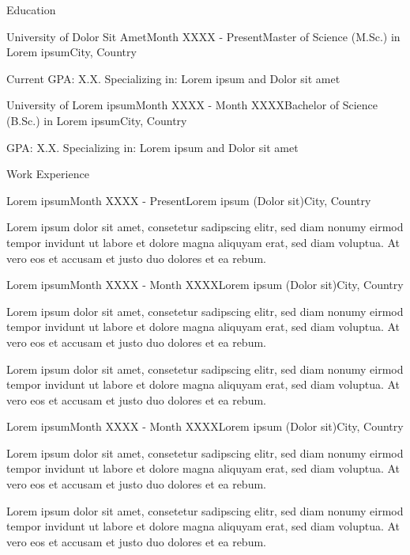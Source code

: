 \documentclass{resume}
\begin{document}
	
	\begin{cvSection}{Education}
		
		\begin{cvSubsection}{University of Dolor Sit Amet}{Month XXXX - Present}{Master of Science (M.Sc.) in Lorem ipsum}{City, Country}
			\item Current GPA: X.X. Specializing in: Lorem ipsum and Dolor sit amet
		\end{cvSubsection}
		
		\begin{cvSubsection}{University of Lorem ipsum}{Month XXXX - Month XXXX}{Bachelor of Science (B.Sc.) in Lorem ipsum}{City, Country}
			\item GPA: X.X. Specializing in: Lorem ipsum and Dolor sit amet
		\end{cvSubsection}
		
	\end{cvSection}
	
	\begin{cvSection}{Work Experience}
		
		\begin{cvSubsection}{Lorem ipsum}{Month XXXX - Present}{Lorem ipsum (Dolor sit)}{City, Country}
			\item Lorem ipsum dolor sit amet, consetetur sadipscing elitr, sed diam nonumy eirmod tempor invidunt ut labore et dolore magna aliquyam erat, sed diam voluptua. At vero eos et accusam et justo duo dolores et ea rebum.
		\end{cvSubsection}
		
		\begin{cvSubsection}{Lorem ipsum}{Month XXXX - Month XXXX}{Lorem ipsum (Dolor sit)}{City, Country}
			\item Lorem ipsum dolor sit amet, consetetur sadipscing elitr, sed diam nonumy eirmod tempor invidunt ut labore et dolore magna aliquyam erat, sed diam voluptua. At vero eos et accusam et justo duo dolores et ea rebum.
			\item Lorem ipsum dolor sit amet, consetetur sadipscing elitr, sed diam nonumy eirmod tempor invidunt ut labore et dolore magna aliquyam erat, sed diam voluptua. At vero eos et accusam et justo duo dolores et ea rebum.
		\end{cvSubsection}
		
		\begin{cvSubsection}{Lorem ipsum}{Month XXXX - Month XXXX}{Lorem ipsum (Dolor sit)}{City, Country}
			\item Lorem ipsum dolor sit amet, consetetur sadipscing elitr, sed diam nonumy eirmod tempor invidunt ut labore et dolore magna aliquyam erat, sed diam voluptua. At vero eos et accusam et justo duo dolores et ea rebum.
			\item Lorem ipsum dolor sit amet, consetetur sadipscing elitr, sed diam nonumy eirmod tempor invidunt ut labore et dolore magna aliquyam erat, sed diam voluptua. At vero eos et accusam et justo duo dolores et ea rebum.
		\end{cvSubsection}
		
	\end{cvSection}
	
\end{document}
